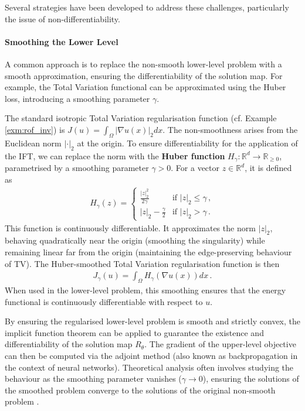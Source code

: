Several strategies have been developed to address these challenges, particularly the issue of non-differentiability.

\paragraph{Smoothing the Lower Level} A common approach is to replace the non-smooth lower-level problem with a smooth approximation, ensuring the differentiability of the solution map. For example, the Total Variation functional can be approximated using the Huber loss, introducing a smoothing parameter $\gamma$.

\begin{exm}\normalfont
The standard isotropic Total Variation regularisation function (cf. Example \ref{exm:rof_inv}) is $J(u) = \int_\Omega |\nabla u(x)|_2 dx$. The non-smoothness arises from the Euclidean norm $|\cdot|_2$ at the origin. To ensure differentiability for the application of the IFT, we can replace the norm with the \textbf{Huber function} $H_\gamma \colon \mathbb{R}^d \to \mathbb{R}_{\geq 0}$, parametrised by a smoothing parameter $\gamma > 0$. For a vector $z \in \mathbb{R}^d$, it is defined as
\begin{align*}
H_\gamma(z) = \begin{cases} \frac{|z|_2^2}{2\gamma} & \text{if } |z|_2 \leq \gamma \, , \\ |z|_2 - \frac{\gamma}{2} & \text{if } |z|_2 > \gamma \, . \end{cases}
\end{align*}
This function is continuously differentiable. It approximates the norm $|z|_2$, behaving quadratically near the origin (smoothing the singularity) while remaining linear far from the origin (maintaining the edge-preserving behaviour of TV). The Huber-smoothed Total Variation regularisation function is then
\begin{align*}
J_\gamma(u) = \int_\Omega H_\gamma(\nabla u(x)) dx \, .
\end{align*}
When used in the lower-level problem, this smoothing ensures that the energy functional is continuously differentiable with respect to $u$.
\end{exm}

By ensuring the regularised lower-level problem is smooth and strictly convex, the implicit function theorem can be applied to guarantee the existence and differentiability of the solution map $R_\theta$. The gradient of the upper-level objective can then be computed via the adjoint method (also known as backpropagation in the context of neural networks). Theoretical analysis often involves studying the behaviour as the smoothing parameter vanishes ($\gamma \to 0$), ensuring the solutions of the smoothed problem converge to the solutions of the original non-smooth problem \cite{delosreyes2016learning}.

